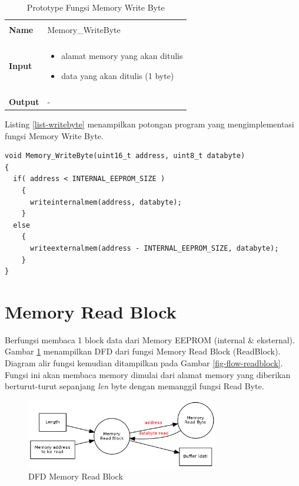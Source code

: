 \begin{table}[!h]
  \centering
  \begin{tabular}{p{2cm} p{8cm}}
    \hline\\
    {\bf Name} & Memory\_WriteByte\\
    \hline\\
    {\bf Input} & 
    \begin{itemize}[noitemsep,topsep=0pt,parsep=0pt,partopsep=0pt]
    \item alamat memory yang akan ditulis
    \item data yang akan ditulis (1 byte)
    \end{itemize}
    \\
    \hline\\
    {\bf Output} & -
    \\
    \hline
  \end{tabular}
  \caption{Prototype Fungsi Memory Write Byte}
  \label{tabel-writebyte}
\end{table}

Listing \ref{list-writebyte} menampilkan potongan program yang mengimplementasi fungsi Memory Write Byte.

\begin{lstlisting}[caption={Listing Program Fungsi Memory Write Byte}, label={list-writebyte}]
void Memory_WriteByte(uint16_t address, uint8_t databyte)
{
  if( address < INTERNAL_EEPROM_SIZE )
    {
      writeinternalmem(address, databyte);
    }
  else
    {
      writeexternalmem(address - INTERNAL_EEPROM_SIZE, databyte);
    }
}
\end{lstlisting}

\section{Memory Read Block}
\label{sec_memoryreadblock}

Berfungsi membaca 1 block data dari Memory EEPROM (internal & eksternal). Gambar \ref{fig-dfd-readblock} menampilkan DFD dari fungsi Memory Read Block (ReadBlock). Diagram alir fungsi kemudian ditampilkan pada Gambar \ref{fig-flow-readblock}. Fungsi ini akan membaca memory dimulai dari alamat memory yang diberikan berturut-turut sepanjang \emph{len} byte dengan memanggil fungsi Read Byte.

\begin{figure}[!h]
\centering
\includegraphics[width=0.75\textwidth]{image/memory/dfd_readblock.png}
\caption{DFD Memory Read Block}
\label{fig-dfd-readblock}
\end{figure}

